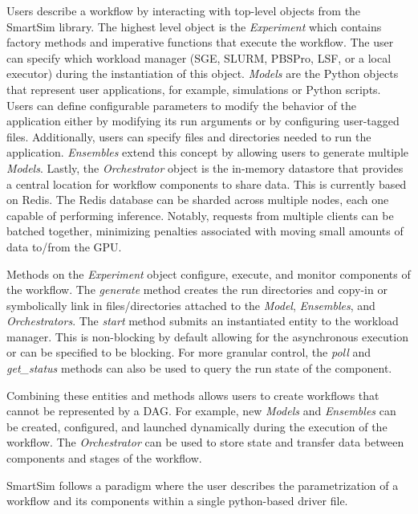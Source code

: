 \documentclass[utf8]{FrontiersinVancouver} %
\begin{document}
Users describe a workflow by interacting with top-level objects from the
SmartSim library. The highest level object is the {\em Experiment} which contains factory methods and imperative functions that execute the workflow. The user can
specify which workload manager (SGE, SLURM, PBSPro, LSF, or a local executor) during the instantiation of this object. {\em Models} are the Python objects that represent user applications, for example, simulations or Python scripts. Users can define configurable parameters to modify the behavior of the application either by modifying its run arguments or by configuring user-tagged files. Additionally, users can specify files and directories needed to run the application. {\em Ensembles} extend this concept by allowing users to generate multiple {\em Models}. Lastly, the {\em Orchestrator} object is the in-memory datastore that provides a central location for workflow components to share data. This is currently based on Redis. The Redis database can be sharded across multiple nodes, each one capable of performing inference. Notably, requests from multiple clients can be batched together, minimizing penalties associated with
moving small amounts of data to/from the GPU.

Methods on the {\em Experiment} object configure, execute, and monitor components of the workflow. The {\em generate} method creates the run directories and copy-in or symbolically link in files/directories attached to the {\em Model},  {\em Ensembles}, and {\em Orchestrators}. The {\em start} method submits an instantiated entity to the workload manager. This is non-blocking by default allowing for the asynchronous execution or can be specified to be blocking. For more granular control, the {\em poll} and {\em get\_status} methods can also be used to query the run state of the component.

Combining these entities and methods allows users to create workflows that cannot be represented by a DAG. For example, new {\em Models} and {\em Ensembles} can be created, configured, and launched dynamically during the execution of the workflow. The {\em Orchestrator} can be used to store state and transfer data between components and stages of the workflow.

SmartSim follows a paradigm where the user describes the parametrization of a workflow and its components within a single python-based driver file.
\end{document}
